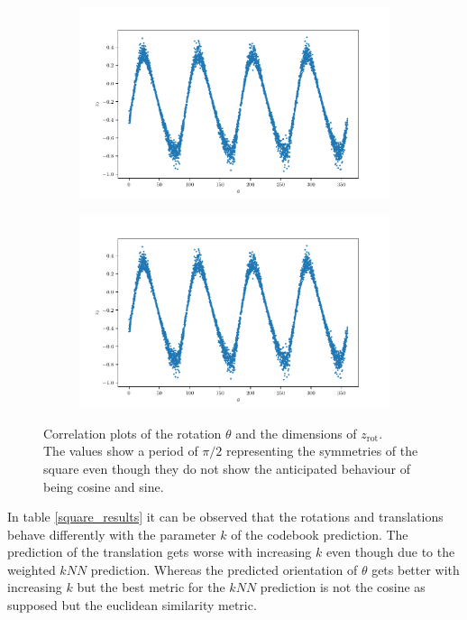 \documentclass[10pt,a4paper]{article}
\newcommand{\rot}{\ensuremath{\text{rot}\xspace}}
\begin{document}
\begin{figure}[!ht]
\centering
\begin{subfigure}{0.49\textwidth}
	\centering
	\includegraphics[width=\textwidth] {square_theta_z0.pdf}
	\caption{}
	\label{fig_zo}
\end{subfigure}
\begin{subfigure}{0.49\textwidth}
	\centering	
	\includegraphics[width=\textwidth]{square_theta_z0.pdf}
	\caption{}
	\label{fig_z1}
\end{subfigure}
\caption{Correlation plots of the rotation $\theta$ and the dimensions of $z_{\rot}$.\\
The values show a period of $\pi/2$ representing the symmetries of the square even though they do not show the anticipated behaviour of being cosine and sine.} \label{Square_corr_rot}
\end{figure}
In table \ref{square_results} it can be observed that the rotations and translations behave differently with the parameter $k$ of the codebook prediction. The prediction of the translation gets worse with increasing $k$ even though due to the weighted $kNN$ prediction. Whereas the predicted orientation of $\theta$ gets better with increasing $k$ but the best metric for the $kNN$ prediction is not the cosine as supposed but the euclidean similarity metric.
\end{document}
